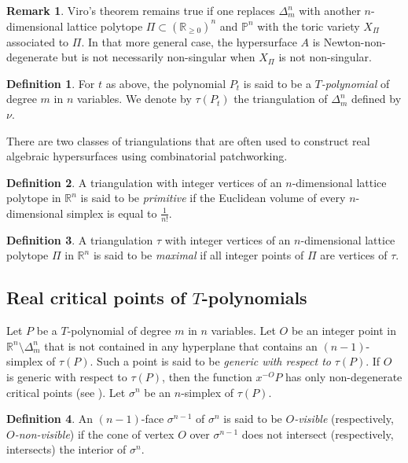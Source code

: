 \documentclass[12pt]{article}
\newcommand{\R}{\mathbb{R}}
\renewcommand{\P}{\mathbb{P}}
\theoremstyle{definition}
\newtheorem{defin}{Definition}[section]
\newtheorem{rmk}{Remark}[section]
\begin{document}
\begin{rmk}
    Viro's theorem remains true if one replaces $\Delta_m^n$ with another $n$-dimensional lattice polytope $\Pi \subset (\R_{\geq 0})^n$ and $\P^n$ with the toric variety $X_{\Pi}$ associated to $\Pi$. In that more general case, the hypersurface $A$ is Newton-non-degenerate but is not necessarily non-singular when $X_{\Pi}$ is not non-singular.
\end{rmk}

\begin{defin}
    For $t$ as above, the polynomial $P_t$ is said to be a $T$\textit{-polynomial} of degree $m$ in $n$ variables. We denote by $\tau(P_t)$ the triangulation of $\Delta_m^n$ defined by $\nu$.
\end{defin}

There are two classes of triangulations that are often used to construct real algebraic hypersurfaces using combinatorial patchworking.

\begin{defin}
    A triangulation with integer vertices of an $n$-dimensional lattice polytope in $\R^n$ is said to be \textit{primitive} if the Euclidean volume of every $n$-dimensional simplex is equal to $\frac{1}{n!}$.
\end{defin}

\begin{defin}
    A triangulation $\tau$ with integer vertices of an $n$-dimensional lattice polytope $\Pi$ in $\R^n$ is said to be \textit{maximal} if all integer points of $\Pi$ are vertices of $\tau$. 
\end{defin}

\subsection{Real critical points of $T$-polynomials}

\begin{sloppypar}
    Let $P$ be a $T$-polynomial of degree $m$ in $n$ variables. Let $O$ be an integer point in $\R^n \setminus \Delta_m^n$ that is not contained in any hyperplane that contains an $(n-1)$-simplex of $\tau(P)$. Such a point is said to be \textit{generic with respect to} $\tau(P)$. If $O$ is generic with respect to $\tau(P)$, then the function $x^{-O}P$ has only non-degenerate critical points (see \cite{itenbergshustincritpts}). Let $\sigma^n$ be an $n$-simplex of $\tau(P)$.
\end{sloppypar}

\begin{defin}
    An $(n-1)$-face $\sigma^{n-1}$ of $\sigma^n$ is said to be $O$\textit{-visible} (respectively, $O$\textit{-non-visible}) if the cone of vertex $O$ over $\sigma^{n-1}$ does not intersect (respectively, intersects) the interior of $\sigma^n$.
\end{defin}
\end{document}
